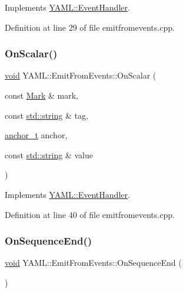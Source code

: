 Implements \mbox{\hyperlink{class_y_a_m_l_1_1_event_handler_aca632ae43f71b6c4f13252d15191f380}{Y\+A\+M\+L\+::\+Event\+Handler}}.



Definition at line 29 of file emitfromevents.\+cpp.

\mbox{\label{class_y_a_m_l_1_1_emit_from_events_a9199c18b9ff840043d74400a8a302752}} 
\subsubsection{\texorpdfstring{OnScalar()}{OnScalar()}}
{\footnotesize\ttfamily \mbox{\hyperlink{glad_8h_a950fc91edb4504f62f1c577bf4727c29}{void}} Y\+A\+M\+L\+::\+Emit\+From\+Events\+::\+On\+Scalar (\begin{DoxyParamCaption}\item[{const \mbox{\hyperlink{struct_y_a_m_l_1_1_mark}{Mark}} \&}]{mark,  }\item[{const \mbox{\hyperlink{glad_8h_ac83513893df92266f79a515488701770}{std\+::string}} \&}]{tag,  }\item[{\mbox{\hyperlink{namespace_y_a_m_l_abeff1798814ae3402fc5665fdcad1de6}{anchor\+\_\+t}}}]{anchor,  }\item[{const \mbox{\hyperlink{glad_8h_ac83513893df92266f79a515488701770}{std\+::string}} \&}]{value }\end{DoxyParamCaption})\hspace{0.3cm}{\ttfamily [virtual]}}



Implements \mbox{\hyperlink{class_y_a_m_l_1_1_event_handler_a1f381a132754352eee6b8dcd218e3abc}{Y\+A\+M\+L\+::\+Event\+Handler}}.



Definition at line 40 of file emitfromevents.\+cpp.

\mbox{\label{class_y_a_m_l_1_1_emit_from_events_ae0d600dcf74515d5cf951c3c68035ff6}} 
\subsubsection{\texorpdfstring{OnSequenceEnd()}{OnSequenceEnd()}}
{\footnotesize\ttfamily \mbox{\hyperlink{glad_8h_a950fc91edb4504f62f1c577bf4727c29}{void}} Y\+A\+M\+L\+::\+Emit\+From\+Events\+::\+On\+Sequence\+End (\begin{DoxyParamCaption}{ }\end{DoxyParamCaption})\hspace{0.3cm}{\ttfamily [virtual]}}



